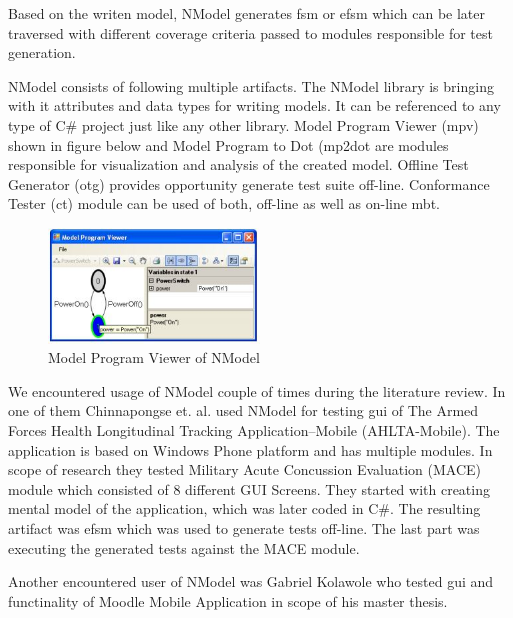 \par
Based on the writen model, NModel generates \acrshort{fsm} or \acrshort{efsm} which can be later traversed with different coverage criteria passed to modules responsible for test generation.

\par
NModel consists of following multiple artifacts. The NModel library is bringing with it attributes and data types for writing models. It can be referenced to any type of C\# project just like any other library. Model Program Viewer (mpv) shown in figure below and Model Program to Dot (mp2dot are modules responsible for visualization and analysis of the created model. Offline Test Generator (otg) provides opportunity generate test suite off-line. Conformance Tester (ct) module can be used of both, off-line as well as on-line \acrshort{mbt}.

\begin{figure} [htbp!]
	\centering
					\includegraphics[width=0.5\textwidth]{figures/NModel_mpv.JPG}
					\caption{\label{Fig:NModel_mpv} Model Program Viewer of NModel}
\end{figure}


\par
We encountered usage of NModel couple of times during the literature review. In one of them Chinnapongse et. al. \cite{Chinnapongse_NModel} used NModel for testing \acrshort{gui} of The Armed Forces Health Longitudinal Tracking Application–Mobile (AHLTA-Mobile). The application is based on Windows Phone platform and has multiple modules. In scope of research they tested Military Acute Concussion Evaluation (MACE) module which consisted of 8 different GUI Screens. They started with creating mental model of the application, which was later coded in C\#. The resulting artifact was \acrshort{efsm} which was used to generate tests off-line. The last part was executing the generated tests against the MACE module.
\par
Another encountered user of NModel was Gabriel Kolawole \cite{Kolawole_NModel} who tested \acrshort{gui} and functinality of Moodle Mobile Application in scope of his master thesis. 

